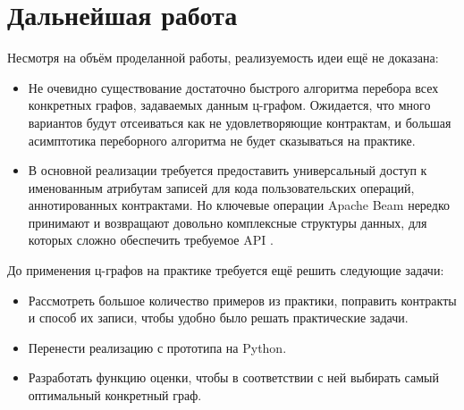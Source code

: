 \section{Дальнейшая работа}

Несмотря на объём проделанной работы, реализуемость идеи ещё не доказана:
\begin{itemize}
    \setlength\itemsep{-0.2em}
    \item Не очевидно существование достаточно быстрого алгоритма перебора всех конкретных графов, задаваемых данным ц-графом. Ожидается, что много вариантов будут отсеиваться как не удовлетворяющие контрактам, и большая асимптотика переборного алгоритма не будет сказываться на практике.
    \item В основной реализации требуется предоставить универсальный доступ к именованным атрибутам записей для кода пользовательских операций, аннотированных контрактами. Но ключевые операции Apache Beam нередко принимают и возвращают довольно комплексные структуры данных, для которых сложно обеспечить требуемое API \cite{beam-transforms}.
\end{itemize}

До применения ц-графов на практике требуется ещё решить следующие задачи:
\begin{itemize}
    \setlength\itemsep{-0.2em}
    \item Рассмотреть большое количество примеров из практики, поправить контракты и способ их записи, чтобы удобно было решать практические задачи.
    \item Перенести реализацию с прототипа на Python.
    \item Разработать функцию оценки, чтобы в соответствии с ней выбирать самый оптимальный конкретный граф.
\end{itemize}
